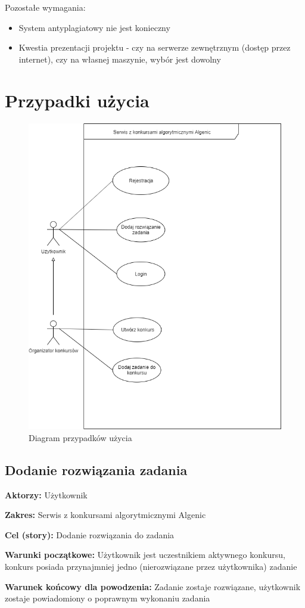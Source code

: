 \documentclass{article}
\begin{document}
Pozostałe wymagania:
\begin{itemize}
	\item System antyplagiatowy nie jest konieczny
	\item Kwestia prezentacji projektu - czy na serwerze zewnętrznym (dostęp przez internet), czy na własnej maszynie, wybór jest dowolny
\end{itemize}

\newpage
\section{Przypadki użycia}


\begin{figure}[H]
	\centering
	\includegraphics[width=.6\linewidth]{useCases.png}
	\caption{Diagram przypadków użycia}
\end{figure}

\subsection{Dodanie rozwiązania zadania}

\textbf{Aktorzy:} Użytkownik

\textbf{Zakres:} Serwis z konkursami algorytmicznymi Algenic

\textbf{Cel (story):} Dodanie rozwiązania do zadania

\textbf{Warunki początkowe:} Użytkownik jest uczestnikiem aktywnego konkursu, konkurs posiada przynajmniej jedno (nierozwiązane przez użytkownika) zadanie

\textbf{Warunek końcowy dla powodzenia:} Zadanie zostaje rozwiązane, użytkownik zostaje powiadomiony o poprawnym wykonaniu zadania
\end{document}
